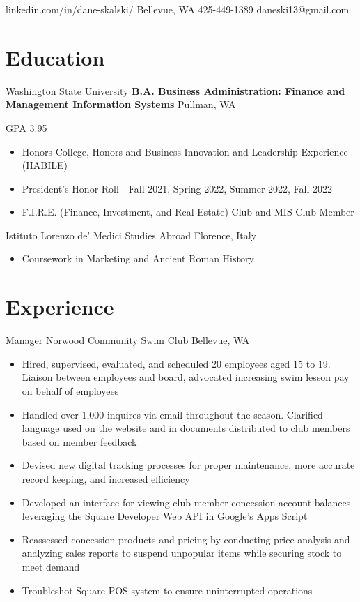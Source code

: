 \documentclass[10pt]{article}
\begin{document}
{linkedin.com/in/dane-skalski/}
{Bellevue, WA}
{425-449-1389}
{daneski13@gmail.com}

\section{Education}
{Washington State University}
{\textbf{B.A. Business Administration: Finance and Management Information Systems}}
{Pullman, WA}
{
    GPA 3.95
    \begin{itemize}
        \item Honors College, Honors and Business Innovation and Leadership Experience (HABILE)
        \item President's Honor Roll - Fall 2021, Spring 2022, Summer 2022, Fall 2022
        \item F.I.R.E. (Finance, Investment, and Real Estate) Club and MIS Club Member
    \end{itemize}
}

{Istituto Lorenzo de' Medici}
{Studies Abroad}
{Florence, Italy}
{
    \begin{itemize}
        \item Coursework in Marketing and Ancient Roman History
    \end{itemize}
}

\section{Experience}
{Manager}
{Norwood Community Swim Club}
{Bellevue, WA}
{
    \begin{itemize}
        \item Hired, supervised, evaluated, and scheduled 20 employees aged 15 to 19. Liaison between employees and board, advocated increasing swim lesson pay on behalf of employees

        \item Handled over 1,000 inquires via email throughout the season. Clarified language used on the website and in documents distributed to club members based on member feedback

        \item Devised new digital tracking processes for proper maintenance, more accurate record keeping, and increased efficiency

        \item Developed an interface for viewing club member concession account balances leveraging the Square Developer Web API in Google's Apps Script

        \item Reassessed concession products and pricing by conducting price analysis and analyzing sales reports to suspend unpopular items while securing stock to meet demand

        \item Troubleshot Square POS system to ensure uninterrupted operations
    \end{itemize}
}
\end{document}
